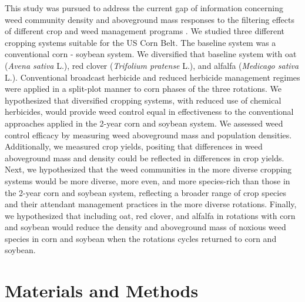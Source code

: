 \documentclass[
]{article}
\begin{document}
This study was pursued to address the current gap of information concerning weed community density and aboveground mass responses to the filtering effects of different crop and weed management programs \citep{ryanManagementFiltersSpecies2010, friedTrajectoriesWeedCommunities2012}. We studied three different cropping systems suitable for the US Corn Belt. The baseline system was a conventional corn - soybean system. We diversified that baseline system with oat (\emph{Avena sativa} L.), red clover (\emph{Trifolium pratense} L.), and alfalfa (\emph{Medicago sativa} L.). Conventional broadcast herbicide and reduced herbicide management regimes were applied in a split-plot manner to corn phases of the three rotations. We hypothesized that diversified cropping systems, with reduced use of chemical herbicides, would provide weed control equal in effectiveness to the conventional approaches applied in the 2-year corn and soybean system. We assessed weed control efficacy by measuring weed aboveground mass and population densities. Additionally, we measured crop yields, positing that differences in weed aboveground mass and density could be reflected in differences in crop yields. Next, we hypothesized that the weed communities in the more diverse cropping systems would be more diverse, more even, and more species-rich than those in the 2-year corn and soybean system, reflecting a broader range of crop species and their attendant management practices in the more diverse rotations. Finally, we hypothesized that including oat, red clover, and alfalfa in rotations with corn and soybean would reduce the density and aboveground mass of noxious weed species in corn and soybean when the rotations cycles returned to corn and soybean.

\hypertarget{materials-and-methods}{%
\section*{Materials and Methods}\label{materials-and-methods}}
\end{document}

